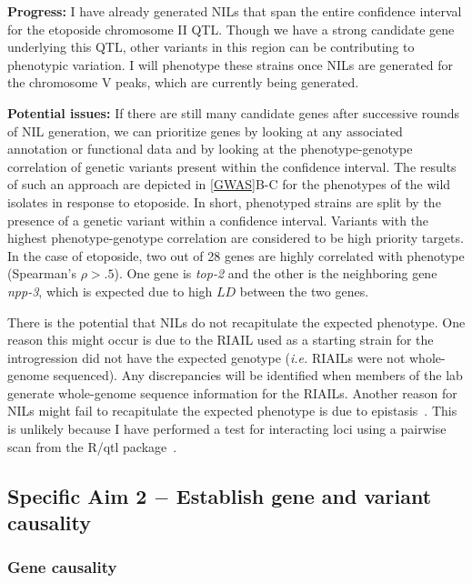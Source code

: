 \documentclass[12pt]{article}
\begin{document}
\vspace{5pt}
{\bf Progress: }I have already generated NILs that span the entire confidence interval for the etoposide chromosome II QTL. Though we have a strong candidate gene underlying this QTL, other variants in this region can be contributing to phenotypic variation. I will phenotype these strains once NILs are generated for the chromosome V peaks, which are currently being generated.

\vspace{5pt}
{\bf Potential issues: }If there are still many candidate genes after successive rounds of NIL generation, we can prioritize genes by looking at any associated annotation or functional data and by looking at the phenotype-genotype correlation of genetic variants present within the confidence interval. The results of such an approach are depicted in \autoref{GWAS}B-C for the phenotypes of the wild isolates in response to etoposide. In short, phenotyped strains are split by the presence of a genetic variant within a confidence interval. Variants with the highest phenotype-genotype correlation are considered to be high priority targets. In the case of etoposide, two out of 28 genes are highly correlated with phenotype (Spearman's $\rho > .5$). One gene is {\it top-2} and the other is the neighboring gene {\it npp-3}, which is expected due to high $LD$ between the two genes. 
\vspace{5pt}

There is the potential that NILs do not recapitulate the expected phenotype. One reason this might occur is due to the RIAIL used as a starting strain for the introgression did not have the expected genotype ({\it i.e.} RIAILs were not whole-genome sequenced). Any discrepancies will be identified when members of the lab generate whole-genome sequence information for the RIAILs. Another reason for NILs might fail to recapitulate the expected phenotype is due to epistasis~\cite{Fisher:2000ta}. This is unlikely because I have performed a test for interacting loci using a pairwise scan from the R/qtl package~\cite{Broman:2009gn}.

\vspace{-5pt}
\subsection{Specific Aim 2 $-$ Establish gene and variant causality}\label{Aim2}

\subsubsection{Gene causality}\label{Aim21}
\end{document}
